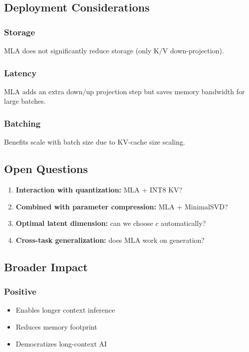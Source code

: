 \subsection{Deployment Considerations}

\subsubsection{Storage}
MLA does not significantly reduce storage (only K/V down-projection).

\subsubsection{Latency}
MLA adds an extra down/up projection step but saves memory bandwidth 
for large batches.

\subsubsection{Batching}
Benefits scale with batch size due to KV-cache size scaling.

\subsection{Open Questions}

\begin{enumerate}
\item \textbf{Interaction with quantization:} MLA + INT8 KV?
\item \textbf{Combined with parameter compression:} MLA + MinimalSVD?
\item \textbf{Optimal latent dimension:} can we choose $c$ automatically?
\item \textbf{Cross-task generalization:} does MLA work on generation?

\end{enumerate}
\subsection{Broader Impact}

\subsubsection{Positive}
\begin{itemize}
\item Enables longer context inference
\item Reduces memory footprint
\item Democratizes long-context AI

\end{itemize}

